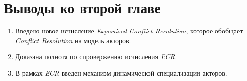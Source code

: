\section{Выводы ко второй главе}

\begin{enumerate}
	\item Введено новое исчисление \emph{Expertised Conflict Resolution}, которое обобщает \emph{Conflict Resolution} на модель акторов.
    \item Доказана полнота по опровержению исчисления \emph{ECR}.
    \item В рамках \emph{ECR} введен механизм динамической специализации акторов.
\end{enumerate}